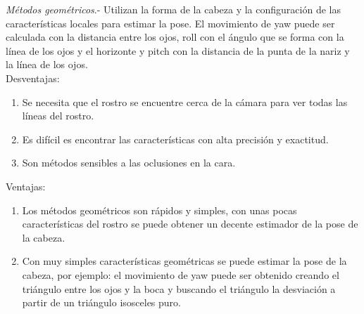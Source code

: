 \begin{itemize}
\textit{Métodos geométricos}.- Utilizan la forma de la cabeza y la configuración de las características locales para estimar la pose. El movimiento de yaw puede ser calculada con la distancia entre los ojos, roll con el ángulo que se forma con la línea de los ojos y el horizonte y pitch con la distancia de la punta de la nariz y la línea de los ojos.
\\Desventajas:
\begin{enumerate}[label=(\alph*)]
	\item Se necesita que el rostro se encuentre cerca de la cámara para ver todas las líneas del rostro.
	\item Es difícil es encontrar las características con alta precisión y exactitud.
	\item Son métodos sensibles a las oclusiones en la cara.
\end{enumerate}
Ventajas:
\begin{enumerate}[label=(\alph*)]
	\item Los métodos geométricos son rápidos y simples, con unas pocas características del rostro se puede obtener un decente estimador de la pose de la cabeza.
	\item Con muy simples características geométricas se puede estimar la pose de la cabeza, por ejemplo: el movimiento de yaw puede ser obtenido creando el triángulo entre los ojos y la boca y buscando el triángulo la desviación a partir de un triángulo isosceles puro.
\end{enumerate}



\end{itemize}

